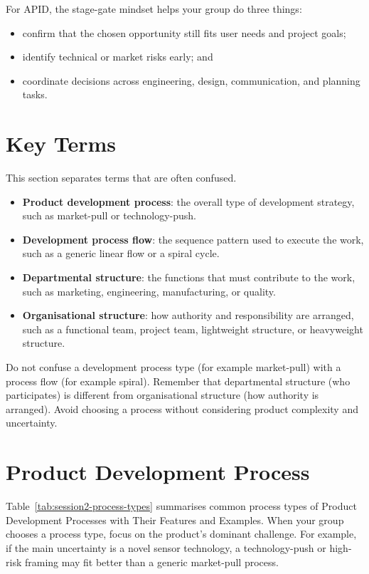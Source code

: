 For APID, the stage-gate mindset helps your group do three things:
\begin{itemize}
    \item confirm that the chosen opportunity still fits user needs and project goals;
    \item identify technical or market risks early; and
    \item coordinate decisions across engineering, design, communication, and planning tasks.
\end{itemize}

\section{Key Terms}

This section separates terms that are often confused.

\begin{itemize}
    \item \textbf{Product development process}: the overall type of development strategy, such as market-pull or technology-push.
    \item \textbf{Development process flow}: the sequence pattern used to execute the work, such as a generic linear flow or a spiral cycle.
    \item \textbf{Departmental structure}: the functions that must contribute to the work, such as marketing, engineering, manufacturing, or quality.
    \item \textbf{Organisational structure}: how authority and responsibility are arranged, such as a functional team, project team, lightweight structure, or heavyweight structure.
\end{itemize}

\begin{tcolorbox}[title=Common Mistakes]
Do not confuse a development process type (for example market-pull) with a process flow (for example spiral). Remember that departmental structure (who participates) is different from organisational structure (how authority is arranged). Avoid choosing a process without considering product complexity and uncertainty.
\end{tcolorbox}

\section{Product Development Process}

Table~\ref{tab:session2-process-types} summarises common process types of Product Development Processes with Their
Features and Examples. When your group chooses a process type, focus on the product's dominant challenge. For example, if the main uncertainty is a novel sensor technology, a technology-push or high-risk framing may fit better than a generic market-pull process.

